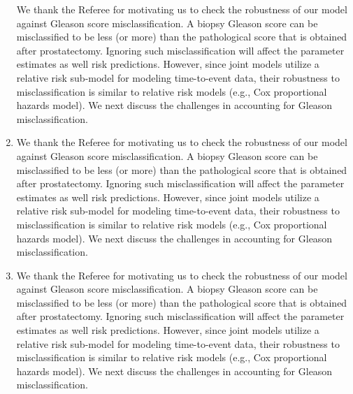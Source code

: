 \begin{enumerate}
We thank the Referee for motivating us to check the robustness of our model against Gleason score misclassification. A biopsy Gleason score can be misclassified to be less (or more) than the pathological score that is obtained after prostatectomy. Ignoring such misclassification will affect the parameter estimates as well risk predictions. However, since joint models utilize a relative risk sub-model for modeling time-to-event data, their robustness to misclassification is similar to relative risk models (e.g., Cox proportional hazards model). We next discuss the challenges in accounting for Gleason misclassification. 

\item \textbf{\color{blue}{Please provide details of how the cumulative-risk $R(T>u \mid T>t,Y(v))$ can be calculated from a time-varying covariate model of the form $P(T>t|Y(t))$ from a joint modeling framework, given $Y(v)$ with $v>t$.}}

We thank the Referee for motivating us to check the robustness of our model against Gleason score misclassification. A biopsy Gleason score can be misclassified to be less (or more) than the pathological score that is obtained after prostatectomy. Ignoring such misclassification will affect the parameter estimates as well risk predictions. However, since joint models utilize a relative risk sub-model for modeling time-to-event data, their robustness to misclassification is similar to relative risk models (e.g., Cox proportional hazards model). We next discuss the challenges in accounting for Gleason misclassification. 

\item \textbf{}

We thank the Referee for motivating us to check the robustness of our model against Gleason score misclassification. A biopsy Gleason score can be misclassified to be less (or more) than the pathological score that is obtained after prostatectomy. Ignoring such misclassification will affect the parameter estimates as well risk predictions. However, since joint models utilize a relative risk sub-model for modeling time-to-event data, their robustness to misclassification is similar to relative risk models (e.g., Cox proportional hazards model). We next discuss the challenges in accounting for Gleason misclassification. 


\end{enumerate}
